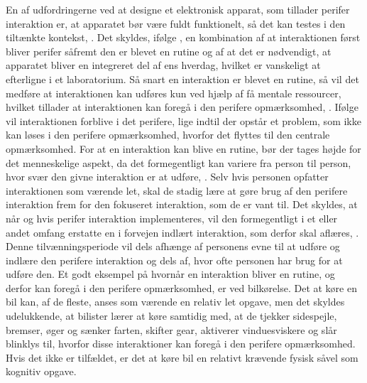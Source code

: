 En af udfordringerne ved at designe et elektronisk apparat, som tillader perifer interaktion er, at apparatet bør være fuldt funktionelt, så det kan testes i den tiltænkte kontekst, \parencite[s. 21]{PDF:EvaluatingPI}. Det skyldes, ifølge \textcite[s. 22]{PDF:EvaluatingPI}, en kombination af at interaktionen først bliver perifer såfremt den er blevet en rutine og af at det er nødvendigt, at apparatet bliver en integreret del af ens hverdag, hvilket er vanskeligt at efterligne i et laboratorium. Så snart en interaktion er blevet en rutine, så vil det medføre at interaktionen kan udføres kun ved hjælp af få mentale ressourcer, hvilket tillader at interaktionen kan foregå i den perifere opmærksomhed, \parencite[s. 2]{PDF:FacilitatingPIDesignAndEvaluation}. Ifølge \textcite[s. 14]{PDF:PIUnseenKap2} vil interaktionen forblive i det perifere, lige indtil der opstår et problem, som ikke kan løses i den perifere opmærksomhed, hvorfor det flyttes til den centrale opmærksomhed. For at en interaktion kan blive en rutine, bør der tages højde for det menneskelige aspekt, da det formegentligt kan variere fra person til person, hvor svær den givne interaktion er at udføre, \parencite[s. 248]{PDF:PICharacteristicsAndConsiderations}. Selv hvis personen opfatter interaktionen som værende let, skal de stadig lære at gøre brug af den perifere interaktion frem for den fokuseret interaktion, som de er vant til. Det skyldes, at når og hvis perifer interaktion implementeres, vil den formegentligt i et eller andet omfang erstatte en i forvejen indlært interaktion, som derfor skal aflæres, \parencite[s. 248]{PDF:PICharacteristicsAndConsiderations}. Denne tilvænningsperiode vil dels afhænge af personens evne til at udføre og indlære den perifere interaktion og dels af, hvor ofte personen har brug for at udføre den. Et godt eksempel på hvornår en interaktion bliver en rutine, og derfor kan foregå i den perifere opmærksomhed, er ved bilkørelse. Det at køre en bil kan, af de fleste, anses som værende en relativ let opgave, men det skyldes udelukkende, at bilister lærer at køre samtidig med, at de tjekker sidespejle, bremser, øger og sænker farten, skifter gear, aktiverer vinduesviskere og slår blinklys til, hvorfor disse interaktioner kan foregå i den perifere opmærksomhed. Hvis det ikke er tilfældet, er det at køre bil en relativt krævende fysisk såvel som kognitiv opgave. \blankline 
%

